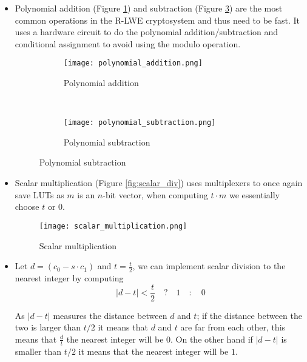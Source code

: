 \begin{itemize}

    \item
        Polynomial addition (Figure \ref{fig:poly_add}) and subtraction (Figure
        \ref{fig:poly_sub}) are the most common operations in the
        R-LWE cryptosystem and thus need to be fast. It uses a hardware circuit
        to do the polynomial addition/subtraction and conditional assignment to
        avoid using the modulo operation.

        \begin{figure}[H]
            \centering
            \begin{subfigure}[b]{0.4\textwidth}
                \centering
                \texttt{[image: polynomial\_addition.png]}
                \caption{Polynomial addition
                \citep{FPGA_Post_Quantum_Primitives}}

                \label{fig:poly_add}
            \end{subfigure}
            ~
            \begin{subfigure}[b]{0.4\textwidth}
                \centering
                \texttt{[image: polynomial\_subtraction.png]}
                \caption{Polynomial subtraction
                \citep{FPGA_Post_Quantum_Primitives}}
                \label{fig:poly_sub}
            \end{subfigure}
        \end{figure}

    \item
        Scalar multiplication (Figure \ref{fig:scalar_div}) uses multiplexers to once again save LUTs as
        $m$ is an $n$-bit vector, when computing $t\cdot m$ we essentially
        choose $t$ or $0$.

        \begin{figure}[H]
            \centering
            \texttt{[image: scalar\_multiplication.png]}
            \caption{Scalar multiplication \citep{FPGA_Post_Quantum_Primitives}}
            \label{fig:scalar_mul}
        \end{figure}

    \item
        Let $d = (c_0 - s \cdot c_1)$ and $t = \frac{t}{2}$, we can implement
        scalar division to the nearest integer by computing
        \[|d - t| < \frac{t}{2} \quad ? \quad 1 \quad : \quad 0\]

        As $|d - t|$ measures the distance between $d$ and $t$; if the
        distance between the two is larger than $t / 2$ it means that $d$ and
        $t$ are far from each other, this means that $\frac{d}{t}$ the nearest
        integer will be $0$. On the other hand if $|d - t|$ is smaller than $t
        / 2$ it means that the nearest integer will be $1$.



\end{itemize}
